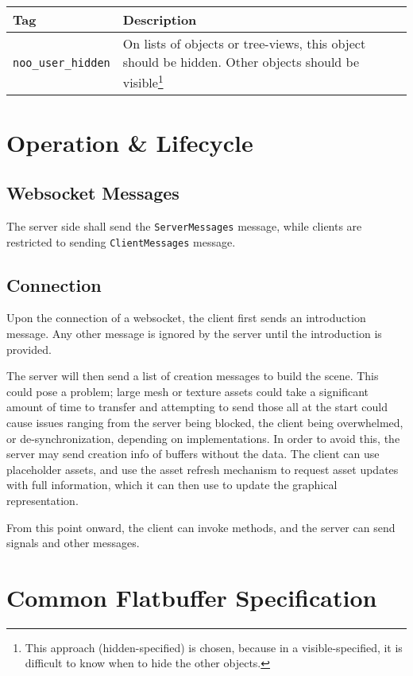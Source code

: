\documentclass[11pt, oneside]{amsart}
\begin{document}
\begin{tabularx}{.9\textwidth}{p{1.5in}X}
	\toprule
	\textbf{Tag} & \textbf{Description} \\
	\midrule
	\texttt{noo\_user\_hidden} & On lists of objects or tree-views, this object should be hidden. Other objects should be visible\footnote{This approach (hidden-specified) is chosen, because in a visible-specified, it is difficult to know when to hide the other objects.} \\
	\bottomrule
\end{tabularx}



\section{Operation \& Lifecycle}

\subsection{Websocket Messages}
The server side shall send the \texttt{ServerMessages} message, while clients are restricted to sending \texttt{ClientMessages} message.

\subsection{Connection}
Upon the connection of a websocket, the client first sends an introduction message. Any other message is ignored by the server until the introduction is provided.

The server will then send a list of creation messages to build the scene. This could pose a problem; large mesh or texture assets could take a significant amount of time to transfer and attempting to send those all at the start could cause issues ranging from the server being blocked, the client being overwhelmed, or de-synchronization, depending on implementations. In order to avoid this, the server may send creation info of buffers without the data. The client can use placeholder assets, and use the asset refresh mechanism to request asset updates with full information, which it can then use to update the graphical representation.

From this point onward, the client can invoke methods, and the server can send signals and other messages.

\appendix

\section{Common Flatbuffer Specification}
\end{document}
